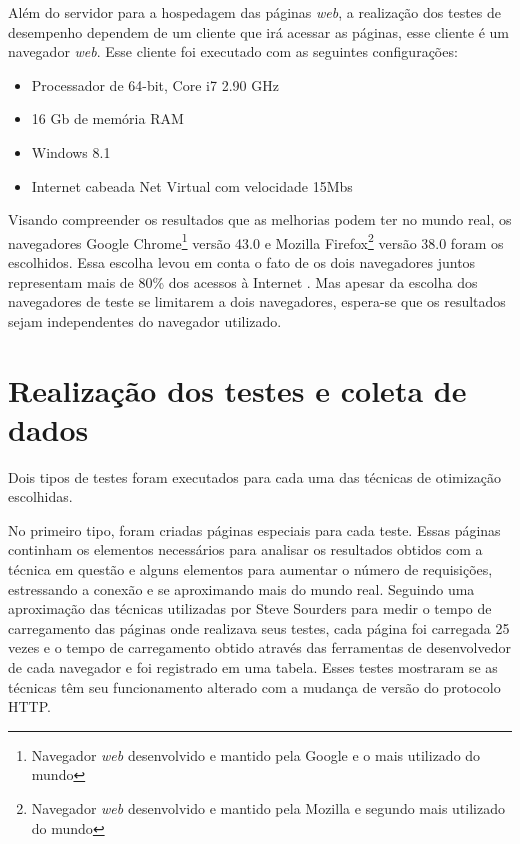 Além do servidor para a hospedagem das páginas \textit{web}, a realização dos testes de desempenho dependem de um cliente que irá acessar as páginas, esse cliente é um navegador \textit{web}. Esse cliente foi executado com as seguintes configurações:

\begin{itemize}
	\item Processador de 64-bit, Core i7 2.90 GHz
	\item 16 Gb de memória RAM
	\item Windows 8.1
	\item Internet cabeada Net Virtual com velocidade 15Mbs
\end{itemize}

Visando compreender os resultados que as melhorias podem ter no mundo real, os navegadores Google Chrome\footnote{Navegador \textit{web} desenvolvido e mantido pela Google e o mais utilizado do mundo} versão 43.0 e Mozilla Firefox\footnote{Navegador \textit{web} desenvolvido e mantido pela Mozilla e segundo mais utilizado do mundo} versão 38.0 foram os escolhidos. Essa escolha levou em conta o fato de os dois navegadores juntos representam mais de 80\% dos acessos à Internet \cite{BrowserPopularity}. Mas apesar da escolha dos navegadores de teste se limitarem a dois navegadores, espera-se que os resultados sejam independentes do navegador utilizado.

\section{Realização dos testes e coleta de dados}
\label{sec:realizacaodostestesecoletadedados}

Dois tipos de testes foram executados para cada uma das técnicas de otimização escolhidas.

No primeiro tipo, foram criadas páginas especiais para cada teste. Essas páginas continham os elementos necessários para analisar os resultados obtidos com a técnica em questão e alguns elementos para aumentar o número de requisições, estressando a conexão e se aproximando mais do mundo real. Seguindo uma aproximação das técnicas utilizadas por Steve Sourders para medir o tempo de carregamento das páginas onde realizava seus testes, cada página foi carregada 25 vezes e o tempo de carregamento obtido através das ferramentas de desenvolvedor de cada navegador e foi registrado em uma tabela. Esses testes mostraram se as técnicas têm seu funcionamento alterado com a mudança de versão do protocolo HTTP.


